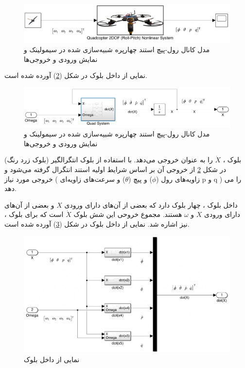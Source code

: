 \begin{figure}[H]
	\includegraphics[width=16cm]{../../Figures/QuadSimulation/roll-pitch_Stand_Model.png}
	\centering
	\vspace*{-15mm}
	\caption{مدل کانال رول-پیچ استند چهارپره شبیه‌سازی شده در سیمولینک و نمایش ورودی و خروجی‌ها}
	\label{roll-pitch_quadsimulink}
\end{figure}
نمایی از داخل بلوک
در شکل (\ref{roll-pitch_Quad3DOF}) آورده شده است.
\begin{figure}[H]
	\includegraphics[width=16cm]{../../Figures/QuadSimulation/roll-pitch_Integrator.png}
	\centering
	\vspace*{-15mm}
	\caption{مدل کانال رول-پیچ استند چهارپره شبیه‌سازی شده در سیمولینک و نمایش ورودی و خروجی‌ها}
	\label{roll-pitch_Quad3DOF}
\end{figure}
بلوک
،
$\dot X$ را به عنوان خروجی می‌دهد. با استفاده از بلوک انتگرالگیر (بلوک زرد رنگ) در شکل
\ref{roll-pitch_Quad3DOF}
از خروجی آن بر اساس شرایط اولیه استند انتگرال گرفته می‌شود و خروجی مورد نیاز ( زاویه‌های رول ($\phi$) و  پیچ ($\theta$) و سرعت‌های زاویه‌ای‌
p
و
q )
را می دهد.

داخل بلوک
،
چهار بلوک دارد که بعضی از آن‌های دارای ورودی $X$ و بعضی از آن‌های دارای ورودی $X$ و $\omega$ هستند. مجموع خروحی این شش بلوک $\dot X$ است که برای بلوک
،
نیز اشاره شد.
نمایی از داخل بلوک
در شکل (\ref{roll-pitch_all-six}) آورده شده است.
\begin{figure}[H]
	\includegraphics[width=16cm]{../../Figures/QuadSimulation/roll-pitch_all-six.png}
	\centering
	\caption{نمایی از داخل بلوک }
	\label{roll-pitch_all-six}
\end{figure}